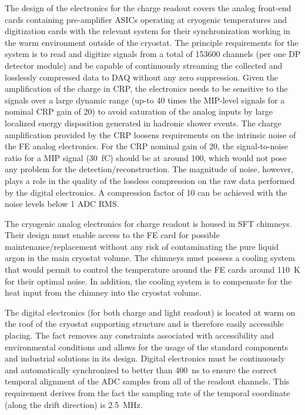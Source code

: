The design of the electronics for the charge readout covers the analog front-end cards containing pre-amplifier ASICs operating at cryogenic temperatures and digitization cards with the relevant system for their synchronization working in the warm environment outside of the cryostat. The principle requirements for the system is to read and digitize signals from a total of \num{153600} channels (per one DP detector module) and be capable of continuously streaming the collected and losslessly compressed data to DAQ without any zero suppression. Given the amplification of the charge in CRP, the electronics needs to be sensitive to the signals over a large dynamic range (up-to \num{40} times the MIP-level signals for a nominal CRP gain of \num{20}) to avoid saturation of the analog inputs by large localized energy disposition generated in hadronic shower events. The charge amplification provided by the CRP loosens requirements on the intrinsic noise of the FE analog electronics. For the CRP nominal gain of \num{20}, the signal-to-noise ratio for a MIP signal (\SI{30}{fC}) should be at around \num{100}, which would not pose any problem for the detection/reconstruction. The magnitude of noise, however, plays a role in the quality of the lossless compression on the raw data performed by the digital electronics. A compression factor of \num{10} can be achieved with the noise levels below \num{1} ADC RMS.  


The cryogenic analog electronics for charge readout is housed in SFT chimneys. Their design must enable access to the FE card for possible maintenance/replacement without any risk of contaminating the pure liquid argon in the main cryostat volume. The chimneys must possess a cooling system that would permit to control the temperature around the FE cards around \SI{110}{\kelvin} for their optimal noise. In addition, the cooling system is to compensate for the heat input from the chimney into the cryostat volume.

The digital electronics (for both charge and light readout) is located at warm on the roof of the cryostat supporting structure and is therefore easily accessible placing. The fact removes any constraints associated with accessibility and environmental conditions and allows for the usage of the standard components and industrial solutions in its design. Digital electronics must be continuously and automatically synchronized to better than \SI{400}{ns} to ensure the correct temporal alignment of the ADC samples from all of the readout channels. This requirement derives from the fact the sampling rate of the temporal coordinate (along the drift direction) is \SI{2.5}{\MHz}. 

